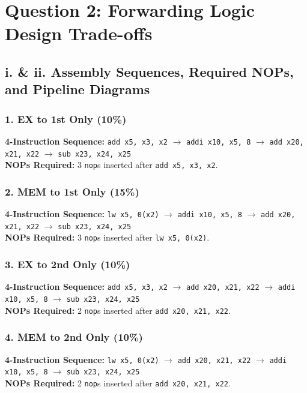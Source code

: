 \documentclass[11pt, a4paper]{article}
\begin{document}
\section*{\textcolor{accent}{Question 2: Forwarding Logic Design Trade-offs}}
\subsection*{i. \& ii. Assembly Sequences, Required NOPs, and Pipeline Diagrams}

\subsubsection*{1. EX to 1st Only (10\%)}
\textbf{4-Instruction Sequence:} \texttt{add x5, x3, x2} $\rightarrow$ \texttt{addi x10, x5, 8} $\rightarrow$ \texttt{add x20, x21, x22} $\rightarrow$ \texttt{sub x23, x24, x25} \\
\textbf{NOPs Required:} 3 \texttt{nop}s inserted after \texttt{add x5, x3, x2}.


\subsubsection*{2. MEM to 1st Only (15\%)}
\textbf{4-Instruction Sequence:} \texttt{lw x5, 0(x2)} $\rightarrow$ \texttt{addi x10, x5, 8} $\rightarrow$ \texttt{add x20, x21, x22} $\rightarrow$ \texttt{sub x23, x24, x25} \\
\textbf{NOPs Required:} 3 \texttt{nop}s inserted after \texttt{lw x5, 0(x2)}.


\subsubsection*{3. EX to 2nd Only (10\%)}
\textbf{4-Instruction Sequence:} \texttt{add x5, x3, x2} $\rightarrow$ \texttt{add x20, x21, x22} $\rightarrow$ \texttt{addi x10, x5, 8} $\rightarrow$ \texttt{sub x23, x24, x25} \\
\textbf{NOPs Required:} 2 \texttt{nop}s inserted after \texttt{add x20, x21, x22}.


\subsubsection*{4. MEM to 2nd Only (10\%)}
\textbf{4-Instruction Sequence:} \texttt{lw x5, 0(x2)} $\rightarrow$ \texttt{add x20, x21, x22} $\rightarrow$ \texttt{addi x10, x5, 8} $\rightarrow$ \texttt{sub x23, x24, x25} \\
\textbf{NOPs Required:} 2 \texttt{nop}s inserted after \texttt{add x20, x21, x22}.
\end{document}
